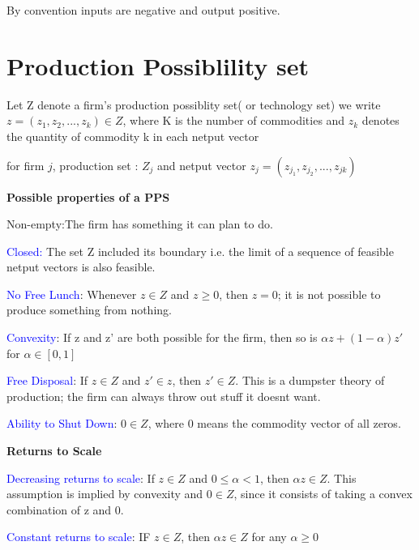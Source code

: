 \documentclass{tufte-handout}
\begin{document}
\textbullet   By convention inputs are negative and output positive.

\section*{\textbf{Production Possiblility set}}

\textbullet   Let Z denote a firm's production possiblity set( or technology set)
\textbullet  we write $z = (z_1,z_2,...,z_k) \in Z$, where K is the number of commodities and $z_k$ denotes the quantity of commodity k in each netput vector

\textbullet   for firm $j$, production set :  $Z_j$ and netput vector  $z_j = (z_{j_1},z_{j_2},...,z_{jk})$

\vspace{1cm}


\textbf{Possible properties of a PPS}

\textbullet   Non-empty:The firm has something it can plan to do.

\textbullet   \textcolor{blue}{Closed:} The set Z included its boundary i.e. the limit of a sequence of feasible netput vectors is also feasible.

\textbullet   \textcolor{blue}{No Free Lunch}: Whenever
$z \in Z$ and  $z \geq 0$, then  $z = 0$; it is not possible to produce something from nothing.

\textbullet  \textcolor{blue}{Convexity}: If z and z' are both possible for the firm, then so is $\alpha z + (1-\alpha)z'$ for  $\alpha \in [0,1]$


 \textbullet  \textcolor{blue}{Free Disposal}: If $z \in Z$ and  $z' \in z$, then  $z' \in  Z$. This is a dumpster theory of production; the firm can always throw out stuff it doesnt want.

\textbullet   \textcolor{blue}{Ability to Shut Down}: $0 \in Z$, where  $0$ means the commodity vector of all zeros.

\vspace{1cm}


\textbf{Returns to Scale}

\textbullet  \textcolor{blue}{Decreasing returns to scale}: If $z \in Z$ and  $0 \leq \alpha < 1$, then  $\alpha z \in Z$. This assumption is implied by convexity and $0 \in Z$, since it consists of taking a convex combination of z and 0. 

 \textbullet  \textcolor{blue}{Constant returns to scale}: IF $z \in Z$, then  $\alpha z \in Z$ for any  $\alpha \geq 0$
\end{document}
